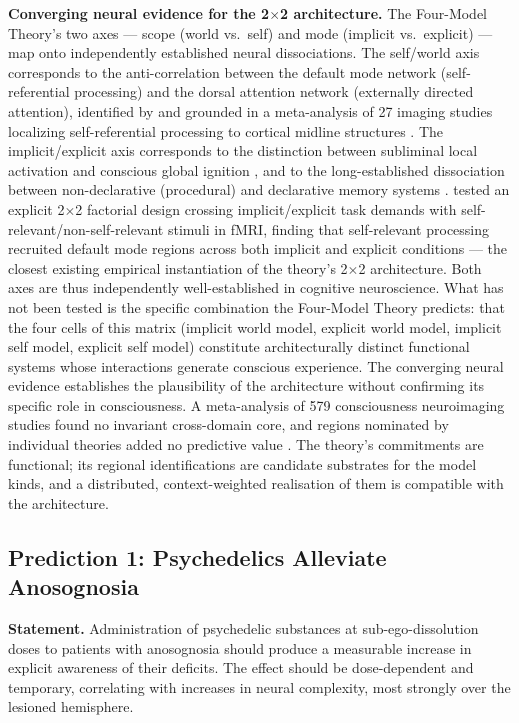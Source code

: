 \documentclass[12pt]{article}
\begin{document}
\textbf{Converging neural evidence for the 2$\times$2 architecture.} The Four-Model Theory's two axes --- scope (world vs.\ self) and mode (implicit vs.\ explicit) --- map onto independently established neural dissociations. The self/world axis corresponds to the anti-correlation between the default mode network (self-referential processing) and the dorsal attention network (externally directed attention), identified by \citet{Fox2005} and grounded in a meta-analysis of 27 imaging studies localizing self-referential processing to cortical midline structures \citep{Northoff2006}. The implicit/explicit axis corresponds to the distinction between subliminal local activation and conscious global ignition \citep{Dehaene2001}, and to the long-established dissociation between non-declarative (procedural) and declarative memory systems \citep{Squire2004}. \citet{Rameson2010} tested an explicit 2$\times$2 factorial design crossing implicit/explicit task demands with self-relevant/non-self-relevant stimuli in fMRI, finding that self-relevant processing recruited default mode regions across both implicit and explicit conditions --- the closest existing empirical instantiation of the theory's 2$\times$2 architecture. Both axes are thus independently well-established in cognitive neuroscience. What has not been tested is the specific combination the Four-Model Theory predicts: that the four cells of this matrix (implicit world model, explicit world model, implicit self model, explicit self model) constitute architecturally distinct functional systems whose interactions generate conscious experience. The converging neural evidence establishes the plausibility of the architecture without confirming its specific role in consciousness. A meta-analysis of 579 consciousness neuroimaging studies found no invariant cross-domain core, and regions nominated by individual theories added no predictive value \citep{Skipper2026}. The theory's commitments are functional; its regional identifications are candidate substrates for the model kinds, and a distributed, context-weighted realisation of them is compatible with the architecture.


\subsection{Prediction 1: Psychedelics Alleviate Anosognosia}


\textbf{Statement.} Administration of psychedelic substances at sub-ego-dissolution doses to patients with anosognosia should produce a measurable increase in explicit awareness of their deficits. The effect should be dose-dependent and temporary, correlating with increases in neural complexity, most strongly over the lesioned hemisphere.
\end{document}
